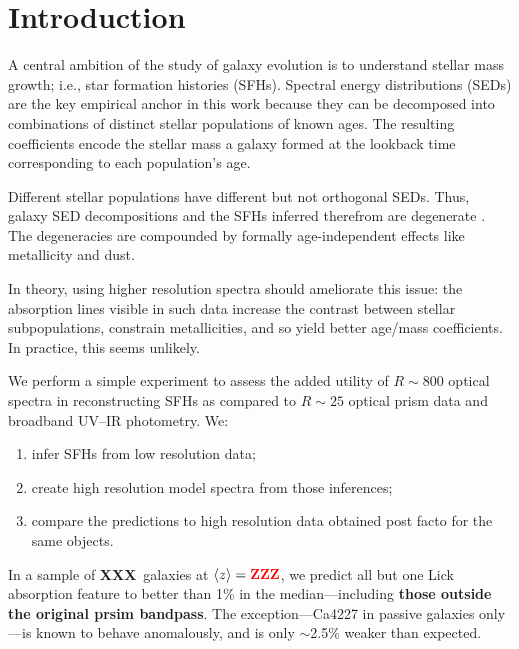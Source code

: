 \documentclass[a4paper,fleqn,usenatbib]{mnras}
\newcommand{\bfr}{\bf\color{red}}
\newcommand{\benum}{\begin{enumerate}}
\newcommand{\eenum}{\end{enumerate}}
\newcommand{\ntot}{{\bfr XXX}} %
\newcommand{\midz}{{\bfr ZZZ}} %
\begin{document}

\section{Introduction}
\label{sec:intro}

A central ambition of the study of galaxy evolution is to understand stellar mass growth; i.e., 
star formation histories (SFHs). Spectral energy distributions (SEDs) are the key empirical anchor 
in this work because they can be decomposed into combinations of distinct stellar populations of 
known ages. The resulting coefficients encode the stellar mass a galaxy formed at the lookback time 
corresponding to each population's age.
	
Different stellar populations have different but not orthogonal SEDs. Thus, galaxy SED decompositions 
and the SFHs inferred therefrom are degenerate \citep{CidFernandes05}. The degeneracies are 
compounded by formally age-independent effects like metallicity and dust. 

In theory, using higher resolution spectra should ameliorate this issue: the absorption lines visible 
in such data increase the contrast between stellar subpopulations, constrain metallicities, and so yield 
better age/mass coefficients. In practice, this seems unlikely.


We perform a simple experiment to assess the added utility of $R\sim800$ optical spectra in 
reconstructing SFHs as compared to $R\sim25$ optical prism data and broadband UV--IR photometry. 
We:
\benum
	\item infer SFHs from low resolution data;
	\item create high resolution model spectra from those inferences;
	\item compare the predictions to high resolution data obtained post facto for the same
		objects. 
\eenum

In a sample of \ntot\ galaxies at $\langle z\rangle=\midz$, we predict all but one Lick absorption 
feature \citep{Worthey94} to better than 1\% in the median---including 
{\bfr those outside the original prsim bandpass}. The exception---Ca4227 in passive 
galaxies only---is known to behave anomalously, and is only $\sim$2.5\% weaker than expected. 
\end{document}
